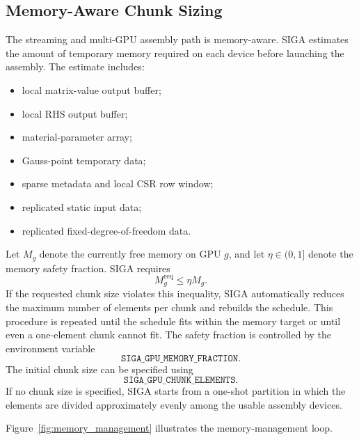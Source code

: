 \documentclass[11pt]{article}
\begin{document}
\subsection{Memory-Aware Chunk Sizing}

The streaming and multi-GPU assembly path is memory-aware. SIGA estimates the amount of temporary memory required on each device before launching the assembly. The estimate includes:
\begin{itemize}
    \item local matrix-value output buffer;
    \item local RHS output buffer;
    \item material-parameter array;
    \item Gauss-point temporary data;
    \item sparse metadata and local CSR row window;
    \item replicated static input data;
    \item replicated fixed-degree-of-freedom data.
\end{itemize}

Let \(M_g\) denote the currently free memory on GPU \(g\), and let \(\eta\in(0,1]\) denote the memory safety fraction. SIGA requires
\[
    M^{\mathrm{req}}_g \leq \eta M_g .
\]
If the requested chunk size violates this inequality, SIGA automatically reduces the maximum number of elements per chunk and rebuilds the schedule. This procedure is repeated until the schedule fits within the memory target or until even a one-element chunk cannot fit. The safety fraction is controlled by the environment variable
\[
    \texttt{SIGA\_GPU\_MEMORY\_FRACTION}.
\]
The initial chunk size can be specified using
\[
    \texttt{SIGA\_GPU\_CHUNK\_ELEMENTS}.
\]
If no chunk size is specified, SIGA starts from a one-shot partition in which the elements are divided approximately evenly among the usable assembly devices.

Figure~\ref{fig:memory_management} illustrates the memory-management loop.
\end{document}
